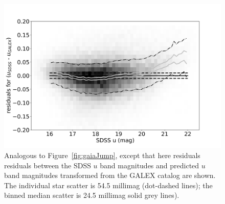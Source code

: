 \documentclass[fleqn,usenatbib]{mnras}
\begin{document}
\begin{figure}
    \centering\includegraphics[width=0.95\columnwidth]{figures/colorResidGALEXug_du_est_umag_Hess.png}
\caption{Analogous to Figure~\ref{fig:gaiaJump}, except that here
  residuals residuals between the SDSS $u$ band magnitudes and
  predicted $u$ band magnitudes transformed from the GALEX catalog are
  shown.  The individual star scatter is 54.5 millimag (dot-dashed
  lines); the binned median scatter is 24.5 millimag solid grey
  lines).
}
\label{fig:GALEX_umag}
\end{figure}
\end{document}
